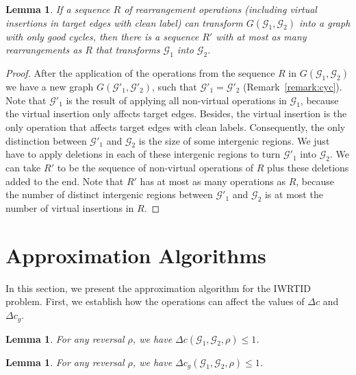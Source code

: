 \documentclass[12pt]{article}
\newtheorem{lemma}[theorem]{Lemma}
\begin{document}
\vspace{8pt}
\begin{lemma}
If a sequence $R$ of rearrangement operations (including virtual insertions in target edges with clean label) can transform $G(\mathcal{G}_1,\mathcal{G}_2)$ into a graph with only good cycles, then there is a sequence $R'$ with at most as many rearrangements as $R$ that transforms $\mathcal{G}_1$ into $\mathcal{G}_2$.
\end{lemma}

\begin{proof}
After the application of the operations from the sequence $R$ in $G(\mathcal{G}_1,\mathcal{G}_2)$ we have a new graph $G(\mathcal{G}'_1,\mathcal{G}'_2)$, such that $\mathcal{G}'_1 = \mathcal{G}'_2$ (Remark~\ref{remark:cyc}). Note that $\mathcal{G}'_1$ is the result of applying all non-virtual operations in $\mathcal{G}_1$, because the virtual insertion only affects target edges. Besides, the virtual insertion is the only operation that affects target edges with clean labels. Consequently, the only distinction between $\mathcal{G}'_1$ and $\mathcal{G}_2$ is the size of some intergenic regions. We just have to apply deletions in each of these intergenic regions to turn $\mathcal{G}'_1$ into $\mathcal{G}_2$. We can take $R'$ to be the sequence of non-virtual operations of $R$ plus these deletions added to the end. Note that $R'$ has at most as many operations as $R$, because the number of distinct intergenic regions between $\mathcal{G}'_1$ and $\mathcal{G}_2$ is at most the number of virtual insertions in $R$.
\end{proof}



\section{Approximation Algorithms}\label{sec:algo}

In this section, we present the approximation algorithm for the IWRTID problem.  First, we establish how the operations can affect the values of $\Delta c$ and $\Delta c_g$.

\vspace{8pt}
\begin{lemma}\cite[Theorem 1]{1996-bafna-pevzner}\label{lemma:lb_r_c}
For any reversal $\rho$, we have $\Delta c(\mathcal{G}_1,\mathcal{G}_2,\rho) \le 1$.
\end{lemma}

\vspace{8pt}
\begin{lemma}\cite[Lemma 2]{2021b-alexandrino-etal}\label{lemma:lb_r_cg}
For any reversal $\rho$, we have $\Delta c_g(\mathcal{G}_1,\mathcal{G}_2,\rho) \le 1$.
\end{lemma}
\end{document}
